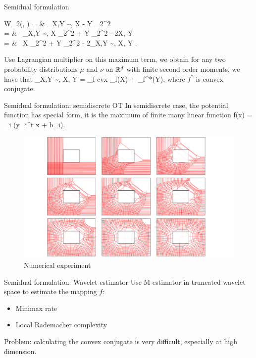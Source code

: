 \documentclass{beamer}
\begin{document}
\begin{frame}{Semidual formulation}
	\bequn
		\begin{aligned}
			W_2(\mu, \nu) = & \min_{X,Y \sim \mu, \nu}\mbE \norml X - Y \normr_2^2		\\
			= & \ \min_{X,Y \sim \mu, \nu}\lp \mbE \norml X \normr_2^2 + \mbE \norml Y \normr_2^2 - 2\mbE \la X, Y \ra \rp 	\\
			= & \  \mbE \norml X \normr_2^2 + \mbE \norml Y \normr_2^2 - 2\max_{X,Y \sim \mu, \nu}\mbE \la X, Y \ra.
		\end{aligned}
	\eequn
	Use Lagrangian multiplier on this maximum term, we obtain for any two probability distributions $\mu$ and $\nu$ on $\mathbb{R}^d$ with finite second order moments, we have that
	\bequn
		\max_{X,Y \sim \mu, \nu}\mbE \la X, Y \ra = \inf_{f cvx} \mbE_{\mu}f(X) + \mbE_{\nu}f^*(Y),
	\eequn
	where $f^*$ is convex conjugate.
\end{frame}


\begin{frame}{Semidual formulation: semidiscrete OT}
	In semidiscrete case, the potential function has special form, it is the maximum of finite many linear function
	\bequn
		f(x) = \max_{i} (y_i^t x + b_i).
	\eequn
	\begin{figure}[H]
          \centering
          \centerline{\includegraphics[width=0.8\linewidth]{Semi-discrete.png}}
          \caption{Numerical experiment}
        \end{figure}
\end{frame}


\begin{frame}{Semidual formulation: Wavelet estimator\footnotemark}
	Use M-estimator in truncated wavelet space to estimate the mapping $f$:
	\begin{itemize}
		\item Minimax rate
		\item Local Rademacher complexity
	\end{itemize}

	\par
	Problem: calculating the convex conjugate is very difficult, especially at high dimension.
\end{frame}
\end{document}
